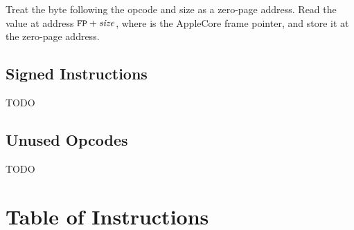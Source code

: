 \documentclass[10pt]{article}
\begin{document}
Treat the byte following the opcode and size as a zero-page
address.  Read the value at address $\texttt{FP}+\mbox{\textit{size}}$, 
where  is the AppleCore frame pointer, and store
it at the zero-page address.

\subsection{Signed Instructions}

TODO

\subsection{Unused Opcodes}

TODO

\newpage

\section{Table of Instructions}
\end{document}
